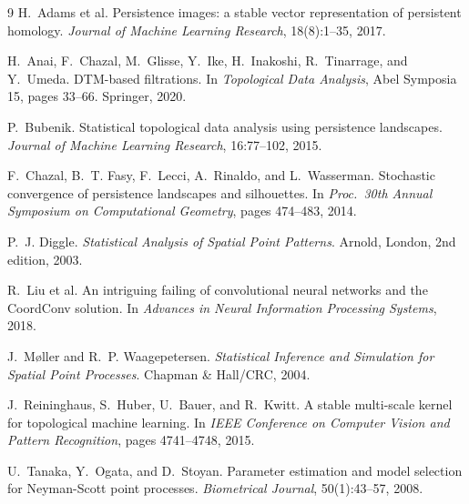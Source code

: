 \documentclass[11pt,a4paper]{article}
\begin{document}
{\footnotesize
\setlength{\bibsep}{1pt plus 0.3ex}
\begin{thebibliography}{9}
\setlength{\itemsep}{0pt}
\setlength{\parskip}{0pt}
H.~Adams et al.
\newblock Persistence images: a stable vector representation of persistent
homology.
\newblock \emph{Journal of Machine Learning Research}, 18(8):1--35, 2017.

H.~Anai, F.~Chazal, M.~Glisse, Y.~Ike, H.~Inakoshi, R.~Tinarrage, and
Y.~Umeda.
\newblock DTM-based filtrations.
\newblock In \emph{Topological Data Analysis}, Abel Symposia 15, pages 33--66.
Springer, 2020.

P.~Bubenik.
\newblock Statistical topological data analysis using persistence landscapes.
\newblock \emph{Journal of Machine Learning Research}, 16:77--102, 2015.

F.~Chazal, B.~T. Fasy, F.~Lecci, A.~Rinaldo, and L.~Wasserman.
\newblock Stochastic convergence of persistence landscapes and silhouettes.
\newblock In \emph{Proc.\ 30th Annual Symposium on Computational Geometry},
pages 474--483, 2014.

P.~J. Diggle.
\newblock \emph{Statistical Analysis of Spatial Point Patterns}.
\newblock Arnold, London, 2nd edition, 2003.

R.~Liu et al.
\newblock An intriguing failing of convolutional neural networks and the
CoordConv solution.
\newblock In \emph{Advances in Neural Information Processing Systems}, 2018.

J.~M\o ller and R.~P. Waagepetersen.
\newblock \emph{Statistical Inference and Simulation for Spatial Point
Processes}.
\newblock Chapman \& Hall/CRC, 2004.

J.~Reininghaus, S.~Huber, U.~Bauer, and R.~Kwitt.
\newblock A stable multi-scale kernel for topological machine learning.
\newblock In \emph{IEEE Conference on Computer Vision and Pattern Recognition},
pages 4741--4748, 2015.

U.~Tanaka, Y.~Ogata, and D.~Stoyan.
\newblock Parameter estimation and model selection for Neyman-Scott point
processes.
\newblock \emph{Biometrical Journal}, 50(1):43--57, 2008.


\end{thebibliography}}
\end{document}
